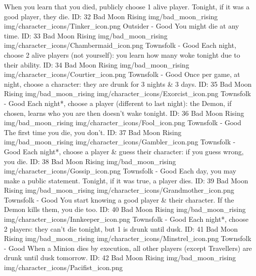 	{When you learn that you died, publicly choose 1 alive player. Tonight, if it was a good player, they die.}        
	{ID: 32}
	{Bad Moon Rising}
	{img/bad_moon_rising}
	{img/character_icons/Tinker_icon.png}
	{\color{goodcolor}Outsider - Good}
	{You might die at any time.}        
	{ID: 33}
	{Bad Moon Rising}
	{img/bad_moon_rising}
	{img/character_icons/Chambermaid_icon.png}
	{\color{goodcolor}Townsfolk - Good}
	{Each night, choose 2 alive players (not yourself): you learn how many woke tonight due to their ability.}        
	{ID: 34}
	{Bad Moon Rising}
	{img/bad_moon_rising}
	{img/character_icons/Courtier_icon.png}
	{\color{goodcolor}Townsfolk - Good}
	{Once per game, at night, choose a character: they are drunk for 3 nights \& 3 days.}        
	{ID: 35}
	{Bad Moon Rising}
	{img/bad_moon_rising}
	{img/character_icons/Exorcist_icon.png}
	{\color{goodcolor}Townsfolk - Good}
	{Each night*, choose a player (different to last night): the Demon, if chosen, learns who you are then doesn't wake tonight.}        
	{ID: 36}
	{Bad Moon Rising}
	{img/bad_moon_rising}
	{img/character_icons/Fool_icon.png}
	{\color{goodcolor}Townsfolk - Good}
	{The first time you die, you don't.}        
	{ID: 37}
	{Bad Moon Rising}
	{img/bad_moon_rising}
	{img/character_icons/Gambler_icon.png}
	{\color{goodcolor}Townsfolk - Good}
	{Each night*, choose a player \& guess their character: if you guess wrong, you die.}        
	{ID: 38}
	{Bad Moon Rising}
	{img/bad_moon_rising}
	{img/character_icons/Gossip_icon.png}
	{\color{goodcolor}Townsfolk - Good}
	{Each day, you may make a public statement. Tonight, if it was true, a player dies.}        
	{ID: 39}
	{Bad Moon Rising}
	{img/bad_moon_rising}
	{img/character_icons/Grandmother_icon.png}
	{\color{goodcolor}Townsfolk - Good}
	{You start knowing a good player \& their character. If the Demon kills them, you die too.}        
	{ID: 40}
	{Bad Moon Rising}
	{img/bad_moon_rising}
	{img/character_icons/Innkeeper_icon.png}
	{\color{goodcolor}Townsfolk - Good}
	{Each night*, choose 2 players: they can't die tonight, but 1 is drunk until dusk.}        
	{ID: 41}
	{Bad Moon Rising}
	{img/bad_moon_rising}
	{img/character_icons/Minstrel_icon.png}
	{\color{goodcolor}Townsfolk - Good}
	{When a Minion dies by execution, all other players (except Travellers) are drunk until dusk tomorrow.}        
	{ID: 42}
	{Bad Moon Rising}
	{img/bad_moon_rising}
	{img/character_icons/Pacifist_icon.png}
